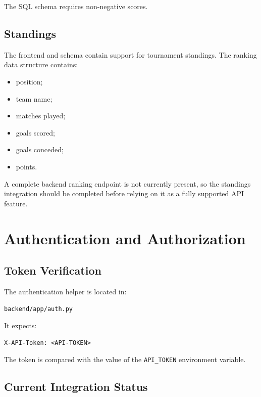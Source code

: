\documentclass[12pt,a4paper]{article}
\begin{document}
The SQL schema requires non-negative scores.

\subsection{Standings}

The frontend and schema contain support for tournament standings.
The ranking data structure contains:

\begin{itemize}
    \item position;
    \item team name;
    \item matches played;
    \item goals scored;
    \item goals conceded;
    \item points.
\end{itemize}

A complete backend ranking endpoint is not currently present, so the
standings integration should be completed before relying on it as a
fully supported API feature.


\section{Authentication and Authorization}

\subsection{Token Verification}

The authentication helper is located in:

\begin{lstlisting}
backend/app/auth.py
\end{lstlisting}

It expects:

\begin{lstlisting}
X-API-Token: <API-TOKEN>
\end{lstlisting}

The token is compared with the value of the \texttt{API\_TOKEN}
environment variable.

\subsection{Current Integration Status}
\end{document}
